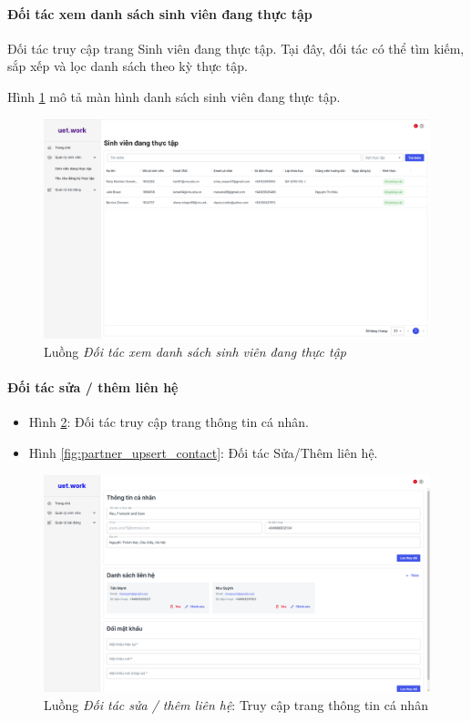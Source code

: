 \documentclass[./../main.tex]{subfiles}
\begin{document}
\paragraph*{Đối tác xem danh sách sinh viên đang thực tập}

Đối tác truy cập trang Sinh viên đang thực tập. Tại đây, đối tác có thể tìm kiếm, sắp xếp và lọc danh sách theo kỳ thực tập.

Hình \ref{fig:partner_view_list_working_students_page} mô tả màn hình danh sách sinh viên đang thực tập.

\begin{figure}[]
	\includegraphics[width=\linewidth]{./images/image9.png}
	\caption{Luồng \emph{Đối tác xem danh sách sinh viên đang thực tập}}
	\label{fig:partner_view_list_working_students_page}
\end{figure}

\paragraph*{Đối tác sửa / thêm liên hệ}

\begin{itemize}
	\item Hình \ref{fig:partner_info_page}: Đối tác truy cập trang thông tin cá nhân.
	\item Hình \ref{fig:partner_upsert_contact}: Đối tác Sửa/Thêm liên hệ.
\end{itemize}

\begin{figure}[]
	\includegraphics[width=\linewidth]{./images/image87.png}
	\caption{Luồng \emph{Đối tác sửa / thêm liên hệ}: Truy cập trang thông tin cá nhân}
	\label{fig:partner_info_page}
\end{figure}
\end{document}
